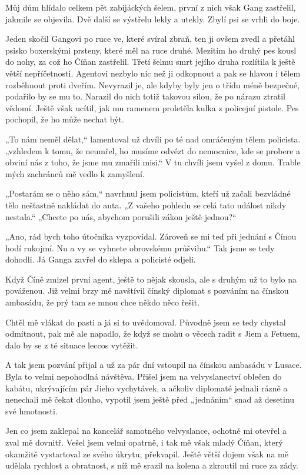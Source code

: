Můj dům hlídalo celkem pět zabijáckých šelem, první z nich však Gang zastřelil, jakmile se objevila. Dvě další se výstřelu lekly a utekly. Zbylí psi se vrhli do boje.  

Jeden skočil Gangovi po ruce ve, které svíral zbraň, ten ji ovšem zvedl a přetáhl psisko boxerskými prsteny, které měl na ruce druhé. Mezitím ho druhý pes kousl do nohy, za což ho Číňan zastřelil. Třetí šelmu smrt jejího druha rozlítila k ještě větší nepříčetnosti. Agentovi nezbylo nic než ji odkopnout a pak se hlavou i tělem rozběhnout proti dveřím. Nevyrazil je, ale kdyby byly jen o třídu méně bezpečné, podařilo by se mu to. Narazil do nich totiž takovou silou, že po nárazu ztratil vědomí. Ještě však ucítil, jak mu ramenem proletěla kulka z policejní pistole. Pes pochopil, že ho může nechat být.

„To nám neměl dělat,“ lamentoval už chvíli po té nad omráčeným tělem policista. „vzhledem k tomu, že neumřel, ho musíme odvézt do nemocnice, kde se probere a obviní nás z toho, že jsme mu zmařili misi.“ V tu chvíli jsem vyšel z domu. Trable mých zachránců mě vedlo k zamyšlení.

„Postarám se o něho sám,“ navrhnul jsem policistům, kteří už začali bezvládné tělo nešťastně nakládat do auta. „Z vašeho pohledu se celá tato událost nikdy nestala.“
„Chcete po nás, abychom porušili zákon ještě jednou?“

„Ano, rád bych toho útočníka vyzpovídal. Zároveň se mi teď při jednání s Čínou hodí rukojmí. Nu a vy se vyhnete obrovskému průšvihu.“ Tak jsme se tedy dohodli.  Já Ganga zavřel do sklepa a policisté odjeli. 

Když Číně zmizel první agent, ještě to nějak skousla, ale s druhým už to bylo na pováženou. Již velmi brzy mě navštívil čínský diplomat s pozváním na čínskou ambasádu, že prý tam se mnou chce někdo něco řešit.

Chtěl mě vlákat do pasti a já si to uvědomoval. Původně jsem se tedy chystal odmítnout, pak mě ale napadlo, že když se mohu o věcech radit s Jiem a Fetuem, dalo by se z té situace leccos vytěžit.

A tak jsem pozvání přijal a už za pár dní vstoupil na čínskou ambasádu v Lusace.
Byla to velmi nepohodlná návštěva. Přišel jsem na velvyslanectví oblečen do kabátu, ukrývajícím pár Jieho vychytávek, a ačkoliv diplomaté jednali rázně a nenechali mě čekat dlouho, vypotil jsem ještě před „jednáním“ snad až desetinu své hmotnosti.

Jen co jsem zaklepal na kancelář samotného velvyslance, ochotně mi otevřel a zval mě dovnitř. Vešel jsem velmi opatrně, i tak mě však mladý Číňan, který okamžitě vystartoval ze svého úkrytu, překvapil. Ještě větší dojem však na mě udělala rychlost a obratnost, s níž mě srazil na kolena a zkroutil mi ruce za zády.


